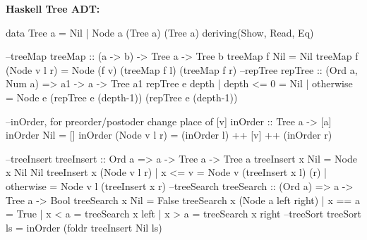 \begin{breakbox}
\textbf{Haskell Tree ADT:}\\
\begin{haskellcode}
data Tree a = Nil | Node a (Tree a) (Tree a) 
			deriving(Show, Read, Eq)

--treeMap
treeMap :: (a -> b) -> Tree a -> Tree b
treeMap f Nil = Nil
treeMap f (Node v l r) = Node (f v) (treeMap f l) (treeMap f r)
--repTree
repTree :: (Ord a, Num a) => a1 -> a -> Tree a1
repTree e depth 
    | depth <= 0 = Nil
    | otherwise  = Node e (repTree e (depth-1)) 
    			(repTree e (depth-1))

--inOrder, for preorder/postoder change place of [v]
inOrder :: Tree a -> [a]
inOrder Nil = []
inOrder (Node v l r) = (inOrder l) ++ [v] ++ (inOrder r)

--treeInsert
treeInsert :: Ord a => a -> Tree a -> Tree a
treeInsert x Nil = Node x Nil Nil
treeInsert x (Node v l r) | x <= v = Node v (treeInsert x l) (r) 
                          | otherwise = Node v l (treeInsert x r)
--treeSearch                          
treeSearch :: (Ord a) => a -> Tree a -> Bool  
treeSearch x Nil = False  
treeSearch x (Node a left right)  
    | x == a = True  
    | x < a  = treeSearch x left  
    | x > a  = treeSearch x right
--treeSort
treeSort ls = inOrder (foldr treeInsert Nil ls)
\end{haskellcode}
\end{breakbox}



